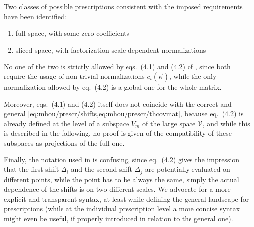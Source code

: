 
Two classes of possible prescriptions consistent with the imposed requirements
have been identified:

\begin{enumerate}
    \item full space, with some zero coefficients
    \item sliced space, with factorization scale dependent normalizations
\end{enumerate}

No one of the two is strictly allowed by eqs.\ (4.1) and (4.2) of
\cite{NNPDF:2019ubu}, since both require the usage of non-trivial
normalizations $c_i(\vec{\kappa})$, while the only normalization allowed by
eq.\ (4.2) is a global one for the whole matrix.

Moreover, eqs.\ (4.1) and (4.2) itself does not coincide with the correct and
general \cref{eq:mhou/prescr/shifts,eq:mhou/prescr/thcovmat}, because eq.\
(4.2) is already defined at the level of a subspace $V_m$ of the large space
$\mathcal{V}$, and while this is described in the following, no proof is given
of the compatibility of these subspaces as projections of the full one.

Finally, the notation used in \cite{NNPDF:2019ubu} is confusing, since eq.\
(4.2) gives the impression that the first shift $\Delta_i$ and the second shift
$\Delta_j$ are potentially evaluated on different points, while the point has
to be always the same, simply the actual dependence of the shifts is on two
different scales.
We advocate for a more explicit and transparent syntax, at least while defining
the general landscape for prescriptions (while at the individual prescription
level a more concise syntax might even be useful, if properly introduced in
relation to the general one).
